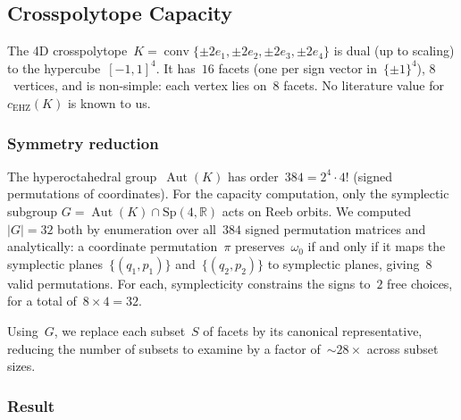 %
%
%

\subsection{Crosspolytope Capacity}
\label{sec:crosspolytope}

The 4D crosspolytope~$K = \operatorname{conv}\{\pm 2e_1, \pm 2e_2,
\pm 2e_3, \pm 2e_4\}$ is dual (up to scaling) to the hypercube~$[-1,1]^4$.
It has~$16$ facets (one per sign vector in~$\{\pm 1\}^4$), $8$~vertices,
and is non-simple: each vertex lies on~$8$ facets.
No literature value for~$c_{\mathrm{EHZ}}(K)$ is known to us.


\subsubsection*{Symmetry reduction}

The hyperoctahedral group~$\operatorname{Aut}(K)$ has order~$384 =
2^4 \cdot 4!$ (signed permutations of coordinates).
For the capacity computation, only the symplectic subgroup
$G = \operatorname{Aut}(K) \cap \mathrm{Sp}(4,\mathbb{R})$
acts on Reeb orbits. We computed~$|G| = 32$ both by enumeration over
all~$384$ signed permutation matrices and analytically:
a coordinate permutation~$\pi$ preserves~$\omega_0$ if and only if it maps
the symplectic planes~$\{(q_1,p_1)\}$ and~$\{(q_2,p_2)\}$ to symplectic
planes, giving~$8$ valid permutations. For each, symplecticity constrains
the signs to~$2$ free choices, for a total of~$8 \times 4 = 32$.

Using~$G$, we replace each subset~$S$ of facets by its canonical
representative, reducing the number of subsets to examine by a factor
of~${\sim}28\times$ across subset sizes.

\subsubsection*{Result}

